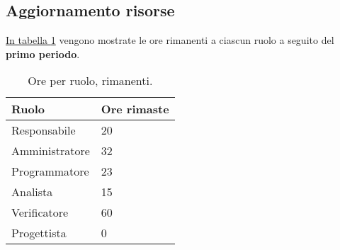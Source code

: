 \subsection{Aggiornamento risorse}

\label{sec:AggiornamentoRisorse_PrimoPeriodo}



\hyperref[tab:risorse_rimaste_primo_periodo]{In tabella \ref{tab:risorse_rimaste_primo_periodo}} vengono mostrate le ore rimanenti a ciascun ruolo a seguito del \textbf{primo periodo}.
\begin{table}[!h]
    \centering
    \begin{tabular}{| l | l |}
    \hline
        \textbf{Ruolo} & 
        \textbf{Ore rimaste}\\
    \hline
        Responsabile & 20\\
    \hline
        Amministratore & 32\\
    \hline
        Programmatore & 23\\
    \hline
        Analista & 15\\
    \hline
        Verificatore & 60\\
    \hline
        Progettista & 0\\
    \hline
    \end{tabular}
    \caption{Ore per ruolo, rimanenti.}
    \label{tab:risorse_rimaste_primo_periodo} 
\end{table}